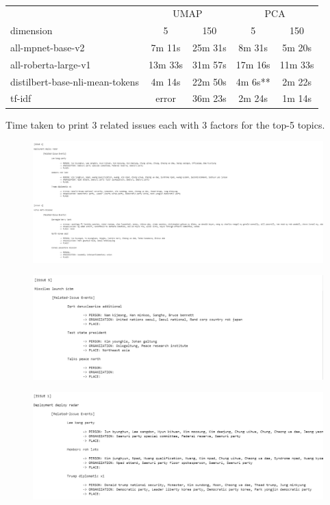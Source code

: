 \documentclass[sigconf,authorversion,nonacm]{acmart}
\begin{document}
\begin{table}[ht]
    \begin{tabularx}{\linewidth}{>{\centering\arraybackslash}Xcccc}
        \toprule
        & \multicolumn{2}{c}{UMAP} & \multicolumn{2}{c}{PCA} \\
        \cmidrule(lr){2-3}\cmidrule(lr){4-5}
        dimension & 5 & 150 & 5 & 150 \\
        \midrule
        \addlinespace[0.5em]
        all-mpnet-base-v2 & 7m 11s & 25m 31s & 8m 31s & 5m 20s \\
        \addlinespace[0.5em]
        all-roberta-large-v1 & 13m 33s & 31m 57s & 17m 16s & 11m 33s \\
        \addlinespace[0.5em]
        distilbert-base-nli-mean-tokens & 4m 14s & 22m 50s & 4m 6s** & 2m 22s \\
        \addlinespace[0.5em]
        tf-idf & error & 36m 23s & 2m 24s & 1m 14s \\
        \bottomrule
    \end{tabularx}
    \caption{}
\end{table}

Time taken to print 3 related issues each with 3 factors for the top-5 topics.

\begin{figure}[ht]
    \includegraphics[width=\linewidth]{img/image12.png}
\end{figure}
\begin{figure}[ht]
    \includegraphics[width=\linewidth]{img/image7.png}
\end{figure}
\begin{figure}[ht]
    \includegraphics[width=\linewidth]{img/image14.png}
\end{figure}
\end{document}

